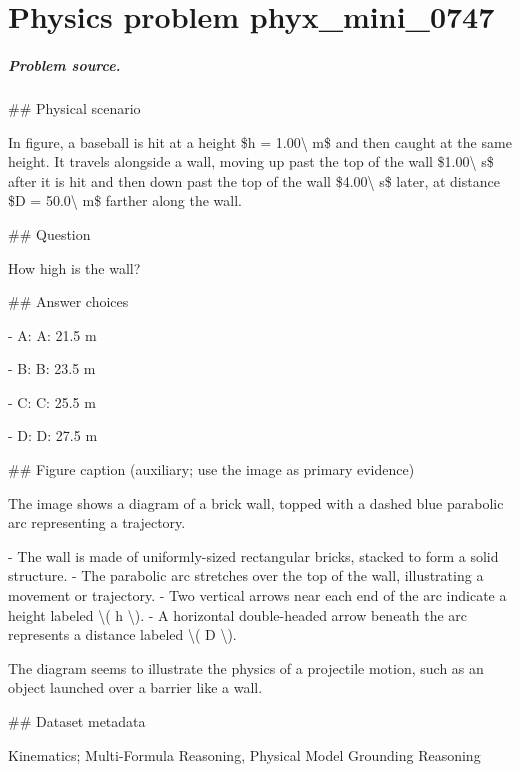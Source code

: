 
\chapter{Physics problem phyx\_mini\_0747}
\label{ch:PhyXMiniProblems_problem_phyx_mini_0747}

\paragraph{Problem source.}
\#\# Physical scenario

In figure, a baseball is hit at a height \$h = 1.00\textbackslash{} m\$ and then caught at the same height. It travels alongside a wall, moving up past the top of the wall \$1.00\textbackslash{} s\$ after it is hit and then down past the top of the wall \$4.00\textbackslash{} s\$ later, at distance \$D = 50.0\textbackslash{} m\$ farther along the wall.

\#\# Question

How high is the wall?

\#\# Answer choices

- A: A: 21.5 m

- B: B: 23.5 m

- C: C: 25.5 m

- D: D: 27.5 m

\#\# Figure caption (auxiliary; use the image as primary evidence)

The image shows a diagram of a brick wall, topped with a dashed blue parabolic arc representing a trajectory. 

- The wall is made of uniformly-sized rectangular bricks, stacked to form a solid structure.
- The parabolic arc stretches over the top of the wall, illustrating a movement or trajectory.
- Two vertical arrows near each end of the arc indicate a height labeled \textbackslash{}( h \textbackslash{}).
- A horizontal double-headed arrow beneath the arc represents a distance labeled \textbackslash{}( D \textbackslash{}). 

The diagram seems to illustrate the physics of a projectile motion, such as an object launched over a barrier like a wall.

\#\# Dataset metadata

Kinematics; Multi-Formula Reasoning, Physical Model Grounding Reasoning

